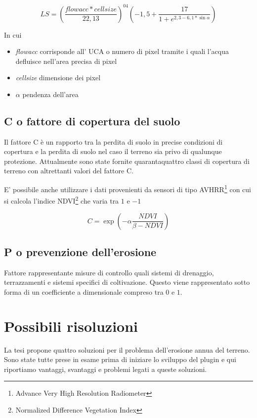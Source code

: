\begin{equation}\label{eq:ls:edit}
LS=\left( \dfrac{flowacc * cellsize}{22,13}\right)^{04} \left( -1,5+\dfrac{17}{1+ e^{2,3-6,1*\sin{\alpha}}} \right) 
\end{equation}

In cui 
\begin{itemize}
	\item \textit{flowacc} corrisponde all' UCA  o numero di pixel tramite i quali l'acqua defluisce nell'area precisa di pixel
	\item \textit{cellsize} dimensione dei pixel
	\item \textit{$\alpha$} pendenza dell'area
\end{itemize}

\subsection{C o fattore di copertura del suolo}
Il fattore C è un rapporto tra la perdita di suolo in precise condizioni di copertura e la perdita di suolo nel caso il terreno sia privo di qualunque protezione.
Attualmente sono state fornite quarantaquattro classi di copertura di terreno con altrettanti valori del fattore C.

E' possibile anche utilizzare i dati provenienti da sensori di tipo AVHRR\footnote{Advance Very High Resolution Radiometer} con cui si calcola l'indice  NDVI\footnote{Normalized Difference Vegetation Index} che varia tra $1$ e $-1$

\begin{equation}\label{eq:c}
	C=\exp\left( -\alpha \dfrac{NDVI}{\beta -NDVI} \right) 
\end{equation}

\subsection{P o prevenzione dell'erosione}
Fattore rappresentante misure di controllo quali sistemi di drenaggio, terrazzamenti e sistemi specifici di coltivazione. 
Questo viene rappresentato sotto forma di un coefficiente a dimensionale compreso tra $0$ e $1$.

\section{Possibili risoluzioni}
La tesi \cite{tesi:ambientale} propone quattro soluzioni per il problema dell'erosione annua del terreno.
Sono state tutte prese in esame prima di iniziare lo sviluppo del plugin e qui riportiamo vantaggi, svantaggi e problemi legati a queste soluzioni.

